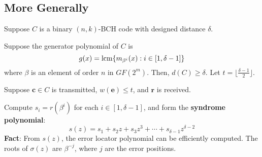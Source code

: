 \subsection*{More Generally}
Suppose $ C $ is a binary $ (n,k) $-BCH code with designed distance $ \delta $.

Suppose the generator polynomial of $ C $ is
\[ g(x)=\operatorname{lcm} \{m_{\beta^i}(x):i\in[1,\delta-1]\} \]
where $ \beta $ is an element of order $ n $ in $ GF(2^m) $. Then, $ d(C)\geqslant \delta $.
Let $ t=\lfloor \frac{\delta-1}{2} \rfloor $.

Suppose $ \symbf{c}\in C $ is transmitted, $ w(\symbf{e})\leqslant t $, and $ \symbf{r} $
is received.

Compute $ s_i=r(\beta^i) $ for each $ i\in[1,\delta-1] $, and form the
\textbf{syndrome polynomial}:
\[ s(z)=s_1+s_2z+s_3z^3+\cdots+s_{\delta-1}z^{\delta-2} \]
\textbf{Fact}: From $ s(z) $, the error locator polynomial
can be efficiently computed. The roots of $ \sigma(z) $
are $ \beta^{-j} $, where $ j $ are the error positions.
